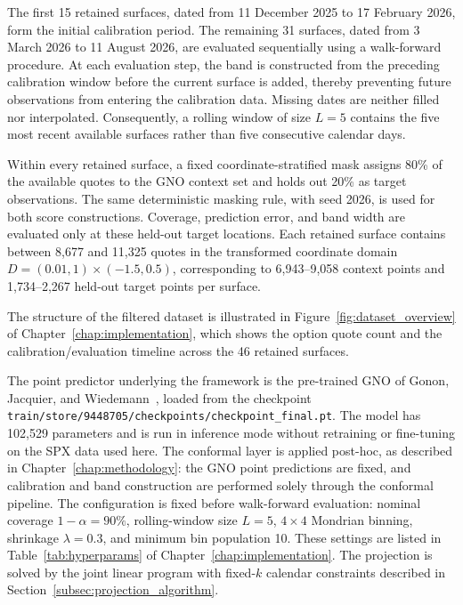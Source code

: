 The first 15 retained surfaces, dated from 11 December 2025 to 17 February 2026, form the initial calibration period. The remaining 31 surfaces, dated from 3 March 2026 to 11 August 2026, are evaluated sequentially using a walk-forward procedure. At each evaluation step, the band is constructed from the preceding calibration window before the current surface is added, thereby preventing future observations from entering the calibration data. Missing dates are neither filled nor interpolated. Consequently, a rolling window of size $L=5$ contains the five most recent available surfaces rather than five consecutive calendar days.

Within every retained surface, a fixed coordinate-stratified mask assigns 80\% of the available quotes to the GNO context set and holds out 20\% as target observations. The same deterministic masking rule, with seed 2026, is used for both score constructions. Coverage, prediction error, and band width are evaluated only at these held-out target locations. Each retained surface contains between 8{,}677 and 11{,}325 quotes in the transformed coordinate domain $D=(0.01,1)\times(-1.5,0.5)$, corresponding to 6{,}943--9{,}058 context points and 1{,}734--2{,}267 held-out target points per surface.

The structure of the filtered dataset is illustrated in Figure~\ref{fig:dataset_overview} of Chapter~\ref{chap:implementation}, which shows the option quote count and the calibration/evaluation timeline across the 46 retained surfaces.

The point predictor underlying the framework is the pre-trained GNO of Gonon, Jacquier, and Wiedemann~\cite{gonon2024operator}, loaded from the checkpoint \texttt{train/store/9448705/checkpoints/checkpoint\_final.pt}. The model has 102,529 parameters and is run in inference mode without retraining or fine-tuning on the SPX data used here. The conformal layer is applied post-hoc, as described in Chapter~\ref{chap:methodology}: the GNO point predictions are fixed, and calibration and band construction are performed solely through the conformal pipeline. The configuration is fixed before walk-forward evaluation: nominal coverage $1-\alpha=90\%$, rolling-window size $L=5$, $4\times4$ Mondrian binning, shrinkage $\lambda=0.3$, and minimum bin population 10. These settings are listed in Table~\ref{tab:hyperparams} of Chapter~\ref{chap:implementation}. The projection is solved by the joint linear program with fixed-$k$ calendar constraints described in Section~\ref{subsec:projection_algorithm}.

